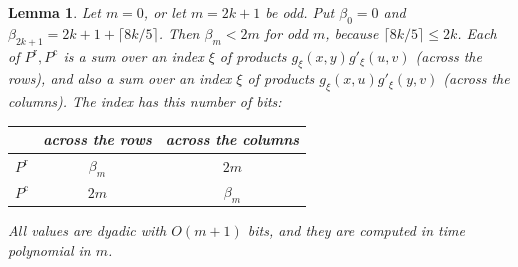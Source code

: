 \documentclass[11pt]{article}
\newtheorem{lemma}{Lemma}
\begin{document}
\begin{lemma}\label{lem:seed}
Let $m=0$, or let $m=2k+1$ be odd. Put $\beta_0=0$ and $\beta_{2k+1}=2k+1+\lceil8k/5\rceil$. Then $\beta_m<2m$ for odd $m$, because $\lceil8k/5\rceil\le2k$. Each of $P^{\mathrm r},P^{\mathrm c}$ is a sum over an index $\xi$ of products $g_\xi(x,y)g'_\xi(u,v)$ (across the rows), and also a sum over an index $\xi$ of products $g_\xi(x,u)g'_\xi(y,v)$ (across the columns). The index has this number of bits:
\begin{center}
\begin{tabular}{l|cc}
 & across the rows & across the columns\\\hline
$P^{\mathrm r}$ & $\beta_m$ & $2m$\\
$P^{\mathrm c}$ & $2m$ & $\beta_m$
\end{tabular}
\end{center}
All values are dyadic with $O(m+1)$ bits, and they are computed in time polynomial in $m$.
\end{lemma}
\end{document}
